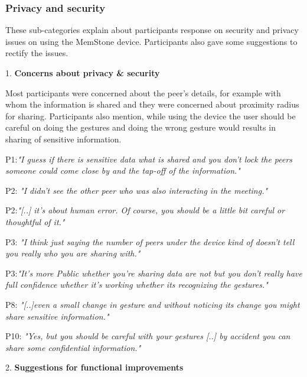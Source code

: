 \documentclass[mscthesis]{usiinfthesis}
\begin{document}
\subsubsection*{Privacy and security}
These sub-categories explain about participants response on security and privacy issues on using the MemStone device. Participants also gave some suggestions to rectify the issues. 

1. \textbf{Concerns about privacy \& security}

Most participants were concerned about the peer's details, for example with whom the information is shared and they were concerned about proximity radius for sharing. Participants also mention, while using the device the user should be careful on doing the gestures and doing the wrong gesture would results in sharing of sensitive information. 
\newline
\hspace{\parindent}\begin{adjustwidth}{1cm}{1cm}
\hspace{\parindent}P1:\textit{"I guess if there is sensitive data what is shared and you don't lock the peers someone could come close by and the tap-off of the information." }

P2: \textit{"I didn't see the other peer who was also interacting in the meeting."}

P2:\textit{"[..] it's about human error. Of course, you should be a little bit careful or thoughtful of it."}

P3:\textit{ "I think just saying the number of peers under the device kind of doesn't tell you really who you are sharing with."}

P3:\textit{"It's more Public whether you're sharing data are not but you don't really have full confidence whether it's working whether its recognizing the gestures."}

P8: \textit{"[..]even a small change in gesture and without noticing its change you might share sensitive information."}

P10: \textit{"Yes, but you should be careful with your gestures [..] by accident you can share some confidential information."}
\newline
\end{adjustwidth}

2. \textbf{Suggestions for functional improvements}
\end{document}
